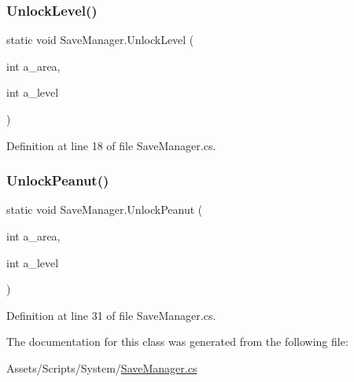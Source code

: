 \subsubsection{\texorpdfstring{Unlock\+Level()}{UnlockLevel()}}
{\footnotesize\ttfamily static void Save\+Manager.\+Unlock\+Level (\begin{DoxyParamCaption}\item[{int}]{a\+\_\+area,  }\item[{int}]{a\+\_\+level }\end{DoxyParamCaption})\hspace{0.3cm}{\ttfamily [static]}}



Definition at line 18 of file Save\+Manager.\+cs.

\mbox{\label{class_save_manager_a2883f213fb94ad733e9ca4826e92e1b7}} 
\subsubsection{\texorpdfstring{Unlock\+Peanut()}{UnlockPeanut()}}
{\footnotesize\ttfamily static void Save\+Manager.\+Unlock\+Peanut (\begin{DoxyParamCaption}\item[{int}]{a\+\_\+area,  }\item[{int}]{a\+\_\+level }\end{DoxyParamCaption})\hspace{0.3cm}{\ttfamily [static]}}



Definition at line 31 of file Save\+Manager.\+cs.



The documentation for this class was generated from the following file\+:\begin{DoxyCompactItemize}
\item 
Assets/\+Scripts/\+System/\mbox{\hyperlink{_save_manager_8cs}{Save\+Manager.\+cs}}\end{DoxyCompactItemize}
